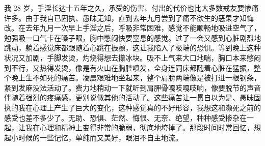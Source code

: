 \begin{case}
    我 28 岁，手淫长达十五年之久，承受的伤害、付出的代价也比大多数戒友要惨痛许多。由于我自已固执、愚昧无知，直到去年九月尝到了痛不欲生的恶果才知悔改。在去年九月一次早上手淫之后，呼吸非常困难，感觉不能顺畅地吸进空气了，勉强吸一口气卡在嗓子眼，胸中憋闷快要窒息的感觉。过了一会又感到心脏剧烈地跳动，躺着感觉床都跟随着心跳在振颤，这让我陷入了极端的恐惧。等到晚上这种状况又加剧，手脚发烫，灼烧得想去攥冰块。吸不上气来大口地喘，胸口本来憋闷到不行，又热得发烫，像是有火山在胸腔喷发，全身连同床都随着心脏在猛振，整个晚上生不如死的痛苦。凌晨艰难地坐起来，整个肩膀两端像是被打进一根钢条，紧到发麻没法活动了。费力地稍动一下就听到肩胛骨嘎吱嘎吱响，像要脱节的声音伴随着强烈的疼痛感，更别说做其他的活动了。这些痛苦让一贯自以为是、愚昧固执的我在心理上产生了巨大的变化，这种感觉真的不好形容，我想这和濒死之前的感受也差不多少了。无助、恐惧、茫然、悔恨、无奈、绝望，种种感受掺杂在一起，让我在心理和精神上变得非常的脆弱，彻底地垮掉了。那段时间时常回忆，想起小时候的一些记忆，单纯而又美好，眼泪不自主地流。


\end{case}
